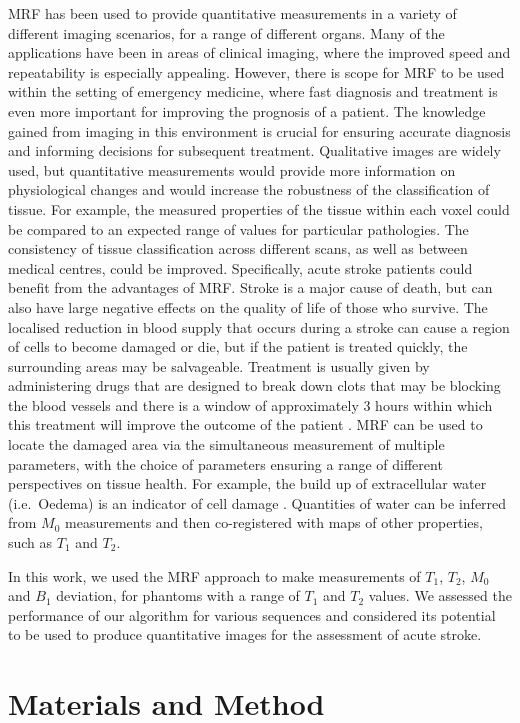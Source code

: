\documentclass[journal]{IEEEtran}
\begin{document}
MRF has been used to provide quantitative measurements in a variety of different imaging scenarios, for a range of different organs. Many of the applications have been in areas of clinical imaging, where the improved speed and repeatability is especially appealing. However, there is scope for MRF to be used within the setting of emergency medicine, where fast diagnosis and treatment is even more important for improving the prognosis of a patient. The knowledge gained from imaging in this environment is crucial for ensuring accurate diagnosis and informing decisions for subsequent treatment.  Qualitative images are widely used, but quantitative measurements would provide more information on physiological changes and would increase the robustness of the classification of tissue. For example, the measured properties of the tissue within each voxel could be compared to an expected range of values for particular pathologies. The consistency of tissue classification across different scans, as well as between medical centres, could be improved. Specifically, acute stroke patients could benefit from the advantages of MRF. Stroke is a major cause of death, but can also have large negative effects on the quality of life of those who survive. The localised reduction in blood supply that occurs during a stroke can cause a region of cells to become damaged or die, but if the patient is treated quickly, the surrounding areas may be salvageable. Treatment is usually given by administering drugs that are designed to break down clots that may be blocking the blood vessels and there is a window of approximately 3 hours within which this treatment will improve the outcome of the patient \cite{alper2015thrombolysis}. MRF can be used to locate the damaged area via the simultaneous measurement of multiple parameters, with the choice of parameters ensuring a range of different perspectives on tissue health. For example, the build up of extracellular water (i.e.\ Oedema) is an indicator of cell damage \cite{harston2015imaging, ayata2002ischaemic}. Quantities of water can be inferred from $M_{0}$ measurements and then co-registered with maps of other properties, such as $T_1$ and $T_2$. 

In this work, we used the MRF approach to make measurements of $T_1$, $T_2$, $M_0$ and $B_1$ deviation, for phantoms with a range of $T_1$ and $T_2$ values. We assessed the performance of our algorithm for various sequences and considered its potential to be used to produce quantitative images for the assessment of acute stroke.
\section{Materials and Method}
\end{document}
